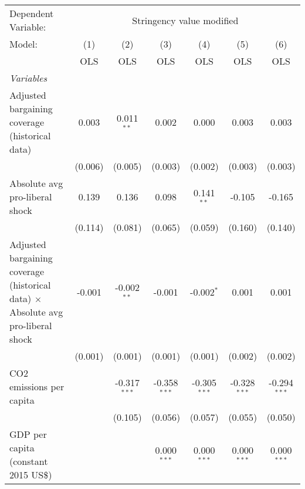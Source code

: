 
\begingroup
\centering
\begin{tabular}{lcccccc}
   \toprule
   Dependent Variable: & \multicolumn{6}{c}{Stringency value modified}\\
   Model:                                                                                  & (1)     & (2)            & (3)            & (4)            & (5)            & (6)\\  
                                                                                           &  OLS    & OLS            & OLS            & OLS            & OLS            & OLS\\  
   \midrule
   \emph{Variables}\\
   Adjusted bargaining coverage (historical data)                                          & 0.003   & 0.011$^{**}$   & 0.002          & 0.000          & 0.003          & 0.003\\   
                                                                                           & (0.006) & (0.005)        & (0.003)        & (0.002)        & (0.003)        & (0.003)\\   
   Absolute avg pro-liberal shock                                                          & 0.139   & 0.136          & 0.098          & 0.141$^{**}$   & -0.105         & -0.165\\   
                                                                                           & (0.114) & (0.081)        & (0.065)        & (0.059)        & (0.160)        & (0.140)\\   
   Adjusted bargaining coverage (historical data) $\times$ Absolute avg pro-liberal shock  & -0.001  & -0.002$^{**}$  & -0.001         & -0.002$^{*}$   & 0.001          & 0.001\\   
                                                                                           & (0.001) & (0.001)        & (0.001)        & (0.001)        & (0.002)        & (0.002)\\   
   CO2 emissions per capita                                                                &         & -0.317$^{***}$ & -0.358$^{***}$ & -0.305$^{***}$ & -0.328$^{***}$ & -0.294$^{***}$\\   
                                                                                           &         & (0.105)        & (0.056)        & (0.057)        & (0.055)        & (0.050)\\   
   GDP per capita (constant 2015 US\$)                                                     &         &                & 0.000$^{***}$  & 0.000$^{***}$  & 0.000$^{***}$  & 0.000$^{***}$\\   

\end{tabular}
